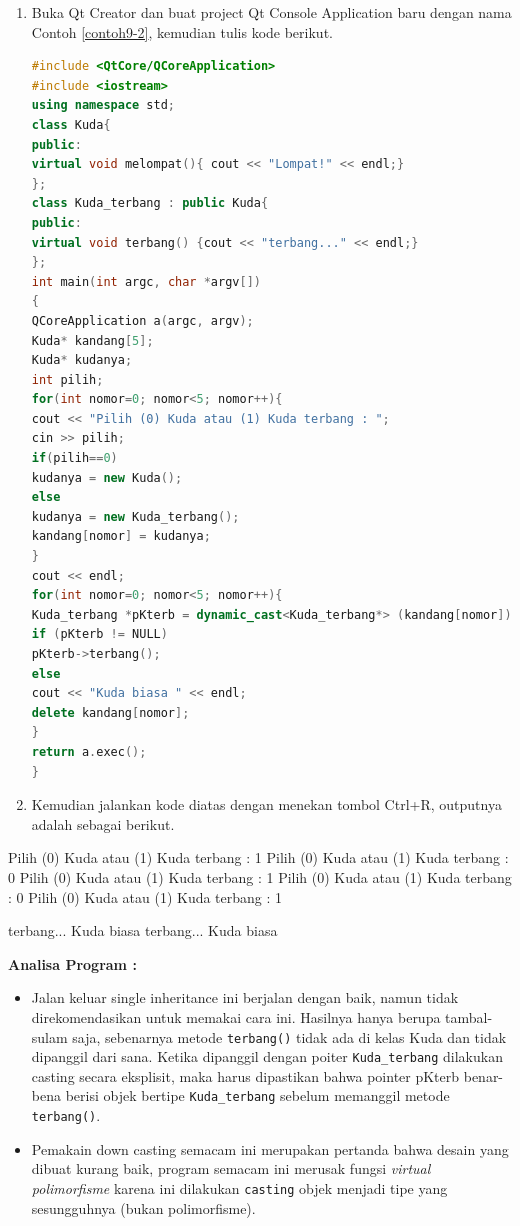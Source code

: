 \begin{enumerate}

\item
  Buka Qt Creator dan buat project Qt Console Application baru dengan
  nama Contoh \ref{contoh9-2}, kemudian tulis kode berikut.

\begin{lstlisting}[language=c++, caption= Melakukan Down Casting, label=contoh9-2]
#include <QtCore/QCoreApplication>
#include <iostream>
using namespace std;
class Kuda{
public:
virtual void melompat(){ cout << "Lompat!" << endl;}
};
class Kuda_terbang : public Kuda{
public:
virtual void terbang() {cout << "terbang..." << endl;}
};
int main(int argc, char *argv[])
{
QCoreApplication a(argc, argv);
Kuda* kandang[5];
Kuda* kudanya;
int pilih;
for(int nomor=0; nomor<5; nomor++){
cout << "Pilih (0) Kuda atau (1) Kuda terbang : ";
cin >> pilih;
if(pilih==0)
kudanya = new Kuda();
else
kudanya = new Kuda_terbang();
kandang[nomor] = kudanya;
}
cout << endl;
for(int nomor=0; nomor<5; nomor++){
Kuda_terbang *pKterb = dynamic_cast<Kuda_terbang*> (kandang[nomor]);
if (pKterb != NULL)
pKterb->terbang();
else
cout << "Kuda biasa " << endl;
delete kandang[nomor];
}
return a.exec();
}
\end{lstlisting}
\item
  Kemudian jalankan kode diatas dengan menekan tombol Ctrl+R, outputnya
  adalah sebagai berikut.
\end{enumerate}

\begin{lcverbatim}
Pilih (0) Kuda atau (1) Kuda terbang : 1
Pilih (0) Kuda atau (1) Kuda terbang : 0
Pilih (0) Kuda atau (1) Kuda terbang : 1
Pilih (0) Kuda atau (1) Kuda terbang : 0
Pilih (0) Kuda atau (1) Kuda terbang : 1

terbang...
Kuda biasa
terbang...
Kuda biasa
\end{lcverbatim}

\textbf{Analisa Program :}

\begin{itemize}

\item
  Jalan keluar single inheritance ini berjalan dengan baik, namun tidak
  direkomendasikan untuk memakai cara ini. Hasilnya hanya berupa
  tambal-sulam saja, sebenarnya metode \texttt{terbang()} tidak ada di
  kelas Kuda dan tidak dipanggil dari sana. Ketika dipanggil dengan
  poiter \texttt{Kuda\_terbang} dilakukan casting secara eksplisit, maka
  harus dipastikan bahwa pointer pKterb benar-bena berisi objek bertipe
  \texttt{Kuda\_terbang} sebelum memanggil metode \texttt{terbang()}.
\item
  Pemakain down casting semacam ini merupakan pertanda bahwa desain yang
  dibuat kurang baik, program semacam ini merusak fungsi \emph{virtual
  polimorfisme} karena ini dilakukan \texttt{casting} objek menjadi tipe
  yang sesungguhnya (bukan polimorfisme).
\end{itemize}

